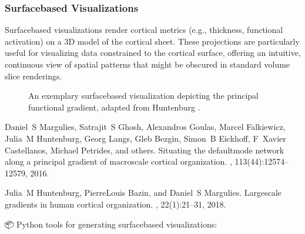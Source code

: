 \documentclass[letterpaper,10pt,english]{jupyterBook}
\begin{document}
\subsubsection{Surface\sphinxhyphen{}based Visualizations}
\label{\detokenize{chapters/03/03b_visualization-tools:surface-based-visualizations}}
\sphinxAtStartPar
Surface\sphinxhyphen{}based visualizations render cortical metrics (e.g., thickness, functional activation) on a 3D model of the cortical sheet. These projections are particularly useful for visualizing data constrained to the cortical surface, offering an intuitive, continuous view of spatial patterns that might be obscured in standard volume slice renderings.

\begin{figure}[htbp]
\centering
\capstart

\noindent{}
\caption{An exemplary surface\sphinxhyphen{}based visualization depicting the principal functional gradient\sphinxfootnotemark[2], adapted from Huntenburg \sphinxfootnotemark[3].}\label{\detokenize{chapters/03/03b_visualization-tools:surf}}\end{figure}
%
\begin{footnotetext}[2]\sphinxAtStartFootnote
Daniel S Margulies, Satrajit S Ghosh, Alexandros Goulas, Marcel Falkiewicz, Julia M Huntenburg, Georg Langs, Gleb Bezgin, Simon B Eickhoff, F Xavier Castellanos, Michael Petrides, and others. Situating the default\sphinxhyphen{}mode network along a principal gradient of macroscale cortical organization. , 113(44):12574–12579, 2016.
%
\end{footnotetext}\ignorespaces %
\begin{footnotetext}[3]\sphinxAtStartFootnote
Julia M Huntenburg, Pierre\sphinxhyphen{}Louis Bazin, and Daniel S Margulies. Large\sphinxhyphen{}scale gradients in human cortical organization. , 22(1):21–31, 2018.
%
\end{footnotetext}\ignorespaces 
\sphinxAtStartPar
📦 Python tools for generating surface\sphinxhyphen{}based visualizations:
\end{document}
